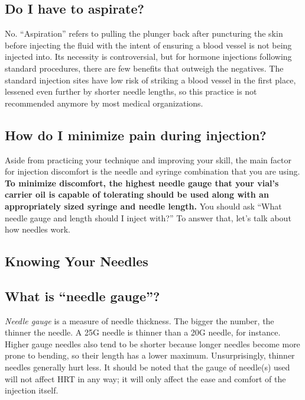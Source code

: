 \documentclass{article}
\begin{document}
{{\subsection{Do I have to aspirate?}

No. “Aspiration” refers to pulling the plunger back after puncturing the skin before injecting the fluid with the intent of ensuring a blood vessel is not being injected into. Its necessity is controversial, but for hormone injections following standard procedures, there are few benefits that outweigh the negatives. The standard injection sites have low risk of striking a blood vessel in the first place, lessened even further by shorter needle lengths, so this practice is not recommended anymore by most medical organizations.

\subsection{How do I minimize pain during injection?}

Aside from practicing your technique and improving your skill, the main factor for injection discomfort is the needle and syringe combination that you are using. \textbf{To minimize discomfort, the highest needle gauge that your vial’s carrier oil is capable of tolerating should be used along with an appropriately sized syringe and needle length. }You should ask “What needle gauge and length should I inject with?” To answer that, let’s talk about how needles work.

\subsection*{Knowing Your Needles}

\subsection{What is “needle gauge”?}

\textit{Needle gauge }is a measure of needle thickness. The bigger the number, the thinner the needle. A 25G needle is thinner than a 20G needle, for instance. Higher gauge needles also tend to be shorter because longer needles become more prone to bending, so their length has a lower maximum. Unsurprisingly, thinner needles generally hurt less. It should be noted that the gauge of needle(s) used will not affect HRT in any way; it will only affect the ease and comfort of the injection itself.

}}
\end{document}
